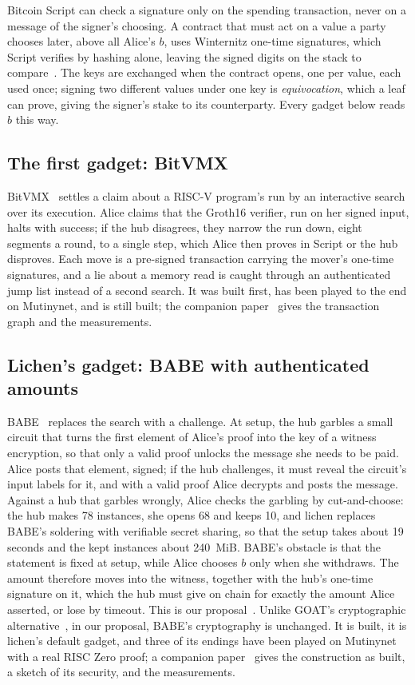\documentclass[11pt]{article}
\begin{document}
Bitcoin Script can check a signature only on the spending transaction,
never on a message of the signer's choosing. A contract that must act on
a value a party chooses later, above all Alice's $b$, uses Winternitz
one-time signatures, which Script verifies by hashing alone, leaving the
signed digits on the stack to compare~\cite{bitvm,bitvmx}. The keys are
exchanged when the contract opens, one per value, each used once;
signing two different values under one key is \emph{equivocation},
which a leaf can prove, giving the signer's stake to its counterparty.
Every gadget below reads $b$ this way.

\subsection{The first gadget: BitVMX}

BitVMX~\cite{bitvmx} settles a claim about a RISC-V program's run by an
interactive search over its execution. Alice claims that the Groth16
verifier, run on her signed input, halts with success; if the hub
disagrees, they narrow the run down, eight segments a round, to a single
step, which Alice then proves in Script or the hub disproves. Each move
is a pre-signed transaction carrying the mover's one-time signatures,
and a lie about a memory read is caught through an authenticated jump
list instead of a second search. It was built first, has been played to
the end on Mutinynet, and is still built; the companion
paper~\cite{lichenbitvmx} gives the transaction graph and the
measurements.

\subsection{Lichen's gadget: BABE with authenticated amounts}

BABE~\cite{babe} replaces the search with a challenge. At setup, the hub
garbles a small circuit that turns the first element of Alice's proof
into the key of a witness encryption, so that only a valid proof unlocks
the message she needs to be paid. Alice posts that element, signed; if
the hub challenges, it must reveal the circuit's input labels for it,
and with a valid proof Alice decrypts and posts the message. Against a
hub that garbles wrongly, Alice checks the garbling by cut-and-choose: the
hub makes 78 instances, she opens 68 and keeps 10, and lichen replaces
BABE's soldering with verifiable secret sharing, so that the setup takes
about 19 seconds and the kept instances about 240~MiB. BABE's obstacle is
that the statement is fixed at setup, while Alice chooses $b$ only when
she withdraws. The amount therefore moves into the witness, together with
the hub's one-time signature on it, which the hub must give on chain for
exactly the amount Alice asserted, or lose by timeout. This is our
proposal~\cite{delving}. Unlike GOAT's cryptographic
alternative~\cite{goat}, in our proposal, BABE's cryptography is
unchanged. It is built, it is lichen's default gadget, and three of its
endings have been played on Mutinynet with a real RISC Zero proof; a
companion paper~\cite{lichenbabe} gives the construction as built, a
sketch of its security, and the measurements.
\end{document}
